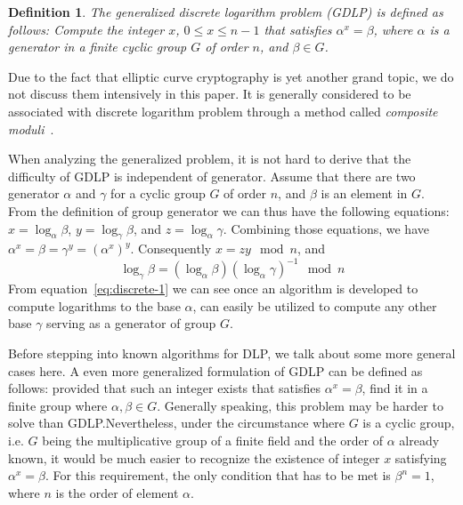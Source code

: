 \documentclass[12pt,journal,compsoc]{IEEEtran}
\newtheorem{definition}{Definition}
\begin{document}
\begin{definition}
The \emph{generalized discrete logarithm problem}
(GDLP) is defined as follows: Compute the integer $x$, $0\leq x\leq
n-1$ that satisfies $\alpha^{x}=\beta$, where $\alpha$ is a generator
in a finite cyclic group $G$ of order $n$, and $\beta\in G$.\label{def:Generalized-DLP}
\end{definition}
Due to the fact that elliptic curve cryptography is yet another grand
topic, we do not discuss them intensively in this paper. It is
generally considered to be associated with discrete logarithm problem
through a method called \emph{composite
  moduli}~\cite{ref:menezes2010handbook}. 
\par
When analyzing the generalized problem, it is not hard to derive that
the difficulty of GDLP is independent of generator. Assume that there
are two generator $\alpha$ and $\gamma$ for a cyclic group $G$ of
order $n$, and $\beta$ is an element in $G$. From the definition of
group generator we can thus have the following equations:
$x=\log_{\alpha}\beta$, $y=\log_{\gamma}\beta$, and
$z=\log_{\alpha}\gamma$. Combining those equations, we have
$\alpha^{x}=\beta=\gamma^{y}={(\alpha^{x})}^{y}$. Consequently
$x=zy\mod n$, and
\begin{equation}
  \label{eq:discrete-1}
  \log_{\gamma}\beta=(\log_{\alpha}\beta){(\log_{\alpha}\gamma)}^{-1}\mod
  n 
\end{equation}
From equation~\eqref{eq:discrete-1} we can see once an algorithm is developed to compute
logarithms to the base $\alpha$, can easily be utilized to compute any
other base $\gamma$ serving as a generator of group $G$.
\par
Before stepping into known algorithms for DLP, we talk about some more
general cases here. A even more generalized formulation of GDLP can be
defined as follows: provided that such an integer exists that
satisfies $\alpha^{x}=\beta$, find it in a finite group where
$\alpha,\beta\in G$. Generally speaking, this problem may be harder to
solve than GDLP.\@ Nevertheless, under the circumstance where $G$ is a
cyclic group, i.e. $G$ being the multiplicative group of a finite
field and the order of $\alpha$ already known, it would be much easier
to recognize the existence of integer $x$ satisfying
$\alpha^{x}=\beta$. For this requirement, the only condition that has
to be met is $\beta^{n}=1$, where $n$ is the order of element
$\alpha$.
\par
\end{document}
